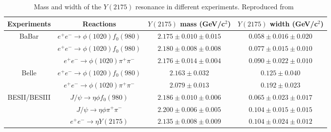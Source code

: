 \begin{table}[H]
    \centering
    \small
    \setlength{\tabcolsep}{3pt}
    \caption{Mass and width of the $Y(2175)$ resonance in different experiments. Reproduced from~\cite{Aubert06, Aubert12, Shen09, Ablikim08, Ablikim15, Ablikim19}}
    \label{tab.1.4}
    \begin{tabular}{|c|c|c|c|}
        \hline
        Experiments & Reactions & \thead{$Y(2175)$ mass\\(GeV/c$^2$)} & \thead{$Y(2175)$ width \\(GeV/c$^2$)} \\
        \hline
        \multirow{3}{*}{BaBar} 
        & $e^{+}e^{-}\rightarrow \phi(1020)f_0(980)$ & $2.175 \pm 0.010 \pm 0.015$ & $0.058 \pm 0.016 \pm 0.020$ \\ 
        & $e^{+}e^{-}\rightarrow \phi(1020)f_0(980)$ & $2.180 \pm 0.008 \pm 0.008$ & $0.077 \pm 0.015 \pm 0.010$ \\ 
        & $e^{+}e^{-}\rightarrow \phi(1020)\pi^{+}\pi^{-}$ & $2.176 \pm 0.014 \pm 0.004$ & $0.090 \pm 0.022 \pm 0.010$ \\ 
        \hline
        \multirow{2}{*}{Belle}
        & $e^{+}e^{-}\rightarrow \phi(1020)f_0(980)$ & $2.163 \pm 0.032$ & $0.125 \pm 0.040$ \\ 
        & $e^{+}e^{-}\rightarrow \phi(1020)\pi^{+}\pi^{-}$ & $2.079 \pm 0.013$ & $0.192 \pm 0.023$ \\
        \hline
        \multirow{2}{*}{BESII/BESIII}
        & $J/\psi \rightarrow \eta \phi f_0(980)$ & $2.186 \pm 0.010 \pm 0.006$ & $0.065 \pm 0.023 \pm 0.017$ \\ 
        & $J/\psi \rightarrow \eta \phi \pi^{+}\pi^{-}$ & $2.200 \pm 0.006 \pm 0.005$ & $0.104 \pm 0.015 \pm 0.015$ \\ 
        & $e^{+}e^{-}\rightarrow \eta Y(2175)$ & $2.135 \pm 0.008 \pm 0.009$ & $0.104 \pm 0.024 \pm 0.012$ \\ 
        \hline
    \end{tabular}
\end{table}

